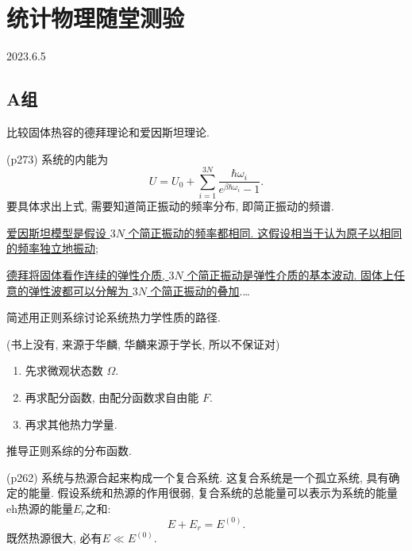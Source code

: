 \section{统计物理随堂测验}
2023.6.5
\subsection{A组}
\begin{questions}
\qt 比较固体热容的德拜理论和爱因斯坦理论.
\begin{solution}
  (p273) 系统的内能为
  \begin{equation}
    U = U_0 + \sum_{i=1}^{3N}\frac{\hbar\omega_
      i}{e^{\beta \hbar\omega_i} - 1}.
  \end{equation}
  要具体求出上式, 需要知道简正振动的频率分布, 即简正振动的频谱.

  \uline{爱因斯坦模型是假设 $3N$ 个简正振动的频率都相同. 这假设相当于认为原子以相同的频率独立地振动};

  \uline{德拜将固体看作连续的弹性介质, $3N$ 个简正振动是弹性介质的基本波动. 固体上任意的弹性波都可以分解为 $3N$ 个简正振动的叠加}.\dots
\end{solution}
  \qt 简述用正则系综讨论系统热力学性质的路径.
\begin{solution}
  (书上没有, 来源于华麟, 华麟来源于学长, 所以不保证对)
  \begin{enumerate}
    \item 先求微观状态数 $\Omega$.
    \item 再求配分函数, 由配分函数求自由能 $F$.
    \item 再求其他热力学量.
  \end{enumerate}
\end{solution}
  \qt 推导正则系综的分布函数.
\begin{solution}
  (p262) 系统与热源合起来构成一个复合系统. 这复合系统是一个孤立系统, 具有确定的能量. 假设系统和热源的作用很弱, 复合系统的总能量可以表示为系统的能量eh热源的能量$E_r$之和:
  \begin{equation}
    E + E_r = E^{(0)}.
  \end{equation}
  既然热源很大, 必有$E\ll E^{(0)}$.


\end{solution}
\end{questions}
